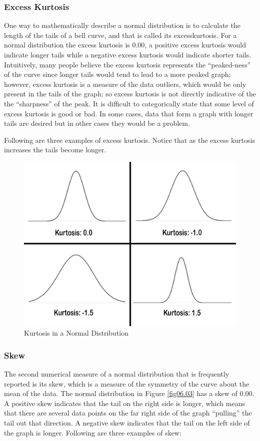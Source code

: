 \subsubsection{Excess Kurtosis}
One way to mathematically describe a normal distribution is to calculate the length of the tails of a bell curve, and that is called its \gls{excesskurtosis}. For a normal distribution the excess kurtosis is $ 0.00 $, a positive excess kurtosis would indicate longer tails while a negative excess kurtosis would indicate shorter tails. Intuitively, many people believe the excess kurtosis represents the ``peaked-ness'' of the curve since longer tails would tend to lead to a more peaked graph; however, excess kurtosis is a measure of the data outliers, which would be only present in the tails of the graph; so excess kurtosis is not directly indicative of the the ``sharpness'' of the peak. It is difficult to categorically state that some level of excess kurtosis is good or bad. In some cases, data that form a graph with longer tails are desired but in other cases they would be a problem.

Following are three examples of excess kurtosis. Notice that as the excess kurtosis increases the tails become longer. 

\begin{figure}[H]
	\centering
	\includegraphics[width=\maxwidth{.95\linewidth}]{gfx/06-Kurtosis}
	\caption{Kurtosis in a Normal Distribution}
	\label{fig06.02}
\end{figure}

\subsubsection{Skew}
The second numerical measure of a normal distribution that is frequently reported is its \gls{skew}, which is a measure of the symmetry of the curve about the mean of the data. The normal distribution in Figure \ref{fig06.03} has a skew of $ 0.00 $. A positive skew indicates that the tail on the right side is longer, which means that there are several data points on the far right side of the graph ``pulling'' the tail out that direction. A negative skew indicates that the tail on the left side of the graph is longer. Following are three examples of skew:

